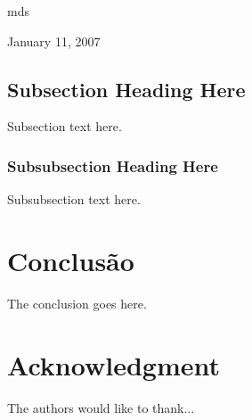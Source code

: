 \documentclass[conference]{IEEEtran}
\begin{document}
\hfill mds
 
\hfill January 11, 2007

\subsection{Subsection Heading Here}
Subsection text here.


\subsubsection{Subsubsection Heading Here}
Subsubsection text here.


\section{Conclusão}
The conclusion goes here.






\section*{Acknowledgment}


The authors would like to thank...




%
%
%




\end{document}
